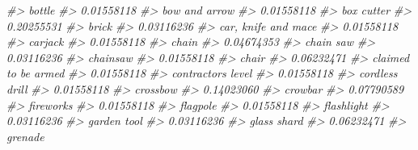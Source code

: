 \documentclass[
  12pt,
  openany]{book}
\newenvironment{Shaded}{\begin{snugshade}}{\end{snugshade}}
\newcommand{\CommentTok}[1]{\textcolor[rgb]{0.37,0.37,0.37}{\textit{#1}}}
\begin{document}
\begin{Shaded}
\begin{Highlighting}[]
\CommentTok{\#\textgreater{}                           bottle }
\CommentTok{\#\textgreater{}                       0.01558118 }
\CommentTok{\#\textgreater{}                    bow and arrow }
\CommentTok{\#\textgreater{}                       0.01558118 }
\CommentTok{\#\textgreater{}                       box cutter }
\CommentTok{\#\textgreater{}                       0.20255531 }
\CommentTok{\#\textgreater{}                            brick }
\CommentTok{\#\textgreater{}                       0.03116236 }
\CommentTok{\#\textgreater{}              car, knife and mace }
\CommentTok{\#\textgreater{}                       0.01558118 }
\CommentTok{\#\textgreater{}                          carjack }
\CommentTok{\#\textgreater{}                       0.01558118 }
\CommentTok{\#\textgreater{}                            chain }
\CommentTok{\#\textgreater{}                       0.04674353 }
\CommentTok{\#\textgreater{}                        chain saw }
\CommentTok{\#\textgreater{}                       0.03116236 }
\CommentTok{\#\textgreater{}                         chainsaw }
\CommentTok{\#\textgreater{}                       0.01558118 }
\CommentTok{\#\textgreater{}                            chair }
\CommentTok{\#\textgreater{}                       0.06232471 }
\CommentTok{\#\textgreater{}              claimed to be armed }
\CommentTok{\#\textgreater{}                       0.01558118 }
\CommentTok{\#\textgreater{}               contractor\textquotesingle{}s level }
\CommentTok{\#\textgreater{}                       0.01558118 }
\CommentTok{\#\textgreater{}                   cordless drill }
\CommentTok{\#\textgreater{}                       0.01558118 }
\CommentTok{\#\textgreater{}                         crossbow }
\CommentTok{\#\textgreater{}                       0.14023060 }
\CommentTok{\#\textgreater{}                          crowbar }
\CommentTok{\#\textgreater{}                       0.07790589 }
\CommentTok{\#\textgreater{}                        fireworks }
\CommentTok{\#\textgreater{}                       0.01558118 }
\CommentTok{\#\textgreater{}                         flagpole }
\CommentTok{\#\textgreater{}                       0.01558118 }
\CommentTok{\#\textgreater{}                       flashlight }
\CommentTok{\#\textgreater{}                       0.03116236 }
\CommentTok{\#\textgreater{}                      garden tool }
\CommentTok{\#\textgreater{}                       0.03116236 }
\CommentTok{\#\textgreater{}                      glass shard }
\CommentTok{\#\textgreater{}                       0.06232471 }
\CommentTok{\#\textgreater{}                          grenade }

\end{Highlighting}
\end{Shaded}
\end{document}
